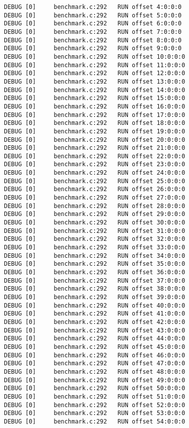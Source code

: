 \begin{verbatim}
DEBUG [0]     benchmark.c:292   RUN offset 4:0:0:0
DEBUG [0]     benchmark.c:292   RUN offset 5:0:0:0
DEBUG [0]     benchmark.c:292   RUN offset 6:0:0:0
DEBUG [0]     benchmark.c:292   RUN offset 7:0:0:0
DEBUG [0]     benchmark.c:292   RUN offset 8:0:0:0
DEBUG [0]     benchmark.c:292   RUN offset 9:0:0:0
DEBUG [0]     benchmark.c:292   RUN offset 10:0:0:0
DEBUG [0]     benchmark.c:292   RUN offset 11:0:0:0
DEBUG [0]     benchmark.c:292   RUN offset 12:0:0:0
DEBUG [0]     benchmark.c:292   RUN offset 13:0:0:0
DEBUG [0]     benchmark.c:292   RUN offset 14:0:0:0
DEBUG [0]     benchmark.c:292   RUN offset 15:0:0:0
DEBUG [0]     benchmark.c:292   RUN offset 16:0:0:0
DEBUG [0]     benchmark.c:292   RUN offset 17:0:0:0
DEBUG [0]     benchmark.c:292   RUN offset 18:0:0:0
DEBUG [0]     benchmark.c:292   RUN offset 19:0:0:0
DEBUG [0]     benchmark.c:292   RUN offset 20:0:0:0
DEBUG [0]     benchmark.c:292   RUN offset 21:0:0:0
DEBUG [0]     benchmark.c:292   RUN offset 22:0:0:0
DEBUG [0]     benchmark.c:292   RUN offset 23:0:0:0
DEBUG [0]     benchmark.c:292   RUN offset 24:0:0:0
DEBUG [0]     benchmark.c:292   RUN offset 25:0:0:0
DEBUG [0]     benchmark.c:292   RUN offset 26:0:0:0
DEBUG [0]     benchmark.c:292   RUN offset 27:0:0:0
DEBUG [0]     benchmark.c:292   RUN offset 28:0:0:0
DEBUG [0]     benchmark.c:292   RUN offset 29:0:0:0
DEBUG [0]     benchmark.c:292   RUN offset 30:0:0:0
DEBUG [0]     benchmark.c:292   RUN offset 31:0:0:0
DEBUG [0]     benchmark.c:292   RUN offset 32:0:0:0
DEBUG [0]     benchmark.c:292   RUN offset 33:0:0:0
DEBUG [0]     benchmark.c:292   RUN offset 34:0:0:0
DEBUG [0]     benchmark.c:292   RUN offset 35:0:0:0
DEBUG [0]     benchmark.c:292   RUN offset 36:0:0:0
DEBUG [0]     benchmark.c:292   RUN offset 37:0:0:0
DEBUG [0]     benchmark.c:292   RUN offset 38:0:0:0
DEBUG [0]     benchmark.c:292   RUN offset 39:0:0:0
DEBUG [0]     benchmark.c:292   RUN offset 40:0:0:0
DEBUG [0]     benchmark.c:292   RUN offset 41:0:0:0
DEBUG [0]     benchmark.c:292   RUN offset 42:0:0:0
DEBUG [0]     benchmark.c:292   RUN offset 43:0:0:0
DEBUG [0]     benchmark.c:292   RUN offset 44:0:0:0
DEBUG [0]     benchmark.c:292   RUN offset 45:0:0:0
DEBUG [0]     benchmark.c:292   RUN offset 46:0:0:0
DEBUG [0]     benchmark.c:292   RUN offset 47:0:0:0
DEBUG [0]     benchmark.c:292   RUN offset 48:0:0:0
DEBUG [0]     benchmark.c:292   RUN offset 49:0:0:0
DEBUG [0]     benchmark.c:292   RUN offset 50:0:0:0
DEBUG [0]     benchmark.c:292   RUN offset 51:0:0:0
DEBUG [0]     benchmark.c:292   RUN offset 52:0:0:0
DEBUG [0]     benchmark.c:292   RUN offset 53:0:0:0
DEBUG [0]     benchmark.c:292   RUN offset 54:0:0:0

\end{verbatim}

